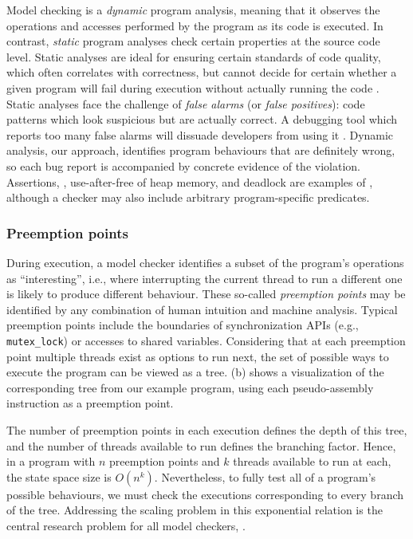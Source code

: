 Model checking is a {\em dynamic} program analysis, meaning that it observes the operations and accesses performed by the program as its code is executed.
In contrast, {\em static} program analyses check certain properties at the source code level.
Static analyses are ideal for ensuring certain standards of code quality, which often correlates with correctness,
but cannot decide for certain whether a given program will fail during execution without actually running the code \cite{incompleteness}.
Static analyses face the challenge of {\em false alarms} (or {\em false positives}):
code patterns which look suspicious but are actually correct.
A debugging tool which reports too many false alarms will dissuade developers from using it \cite{racerx}.
Dynamic analysis, our approach, identifies program behaviours that are definitely wrong,
so each bug report is accompanied by concrete evidence of the violation.
Assertions, , use-after-free of heap memory,
and deadlock are examples of ,
although a checker may also include arbitrary program-specific predicates.

\subsubsection{Preemption points}

During execution, a model checker identifies a subset of the program's operations as ``interesting'', i.e.,
where interrupting the current thread to run a different one is likely to produce different behaviour.
These so-called {\em preemption points} may be identified by any combination of human intuition and machine analysis.
Typical preemption points include the boundaries of synchronization APIs (e.g., {\tt mutex\_lock}) or accesses to shared variables.
Considering that at each preemption point multiple threads exist as options to run next,
the set of possible ways to execute the program can be viewed as a tree.
(b) shows a visualization of the corresponding tree from our example program,
using each pseudo-assembly instruction as a preemption point.

The number of preemption points in each execution defines the depth of this tree,
and the number of threads available to run defines the branching factor.
Hence, in a program with $n$ preemption points and $k$ threads available to run at each, the state space size is $O(n^k)$.
Nevertheless, to fully test all of a program's possible behaviours, we must check the executions corresponding to every branch of the tree.
Addressing the scaling problem in this exponential relation is the central research problem for all model checkers,
.

